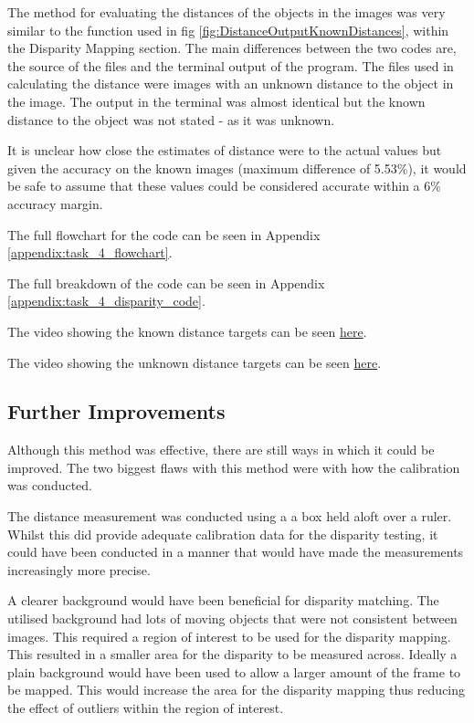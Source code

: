 \documentclass[conference]{IEEEtran}
\begin{document}
The method for evaluating the distances of the objects in the images was very similar to the function used in fig \ref{fig:DistanceOutputKnownDistances}, within the Disparity Mapping section. The main differences between the two codes are, the source of the files and the terminal output of the program. The files used in calculating the distance were images with an unknown distance to the object in the image. The output in the terminal was almost identical but the known distance to the object was not stated - as it was unknown. 

It is unclear how close the estimates of distance were to the actual values but given the accuracy on the known images (maximum difference of 5.53\%), it would be safe to assume that these values could be considered accurate within a 6\% accuracy margin.

The full flowchart for the code can be seen in Appendix \ref{appendix:task_4_flowchart}.

The full breakdown of the code can be seen in Appendix \ref{appendix:task_4_disparity_code}.

The video showing the known distance targets can be seen \href{https://youtu.be/jV-Ht9x28nk}{here}.

The video showing the unknown distance targets can be seen \href{https://youtu.be/g0bPXUbjqvo}{here}.

\subsection{Further Improvements}

Although this method was effective, there are still ways in which it could be improved. The two biggest flaws with this method were with how the calibration was conducted.

The distance measurement was conducted using a a box held aloft over a ruler. Whilst this did provide adequate calibration data for the disparity testing, it could have been conducted in a manner that would have made the measurements increasingly more precise. 

A clearer background would have been beneficial for disparity matching. The utilised background had lots of moving objects that were not consistent between images. This required a region of interest to be used for the disparity mapping. This resulted in a smaller area for the disparity to be measured across. Ideally a plain background would have been used to allow a larger amount of the frame to be mapped. This would increase the area for the disparity mapping thus reducing the effect of outliers within the region of interest. 
\end{document}
